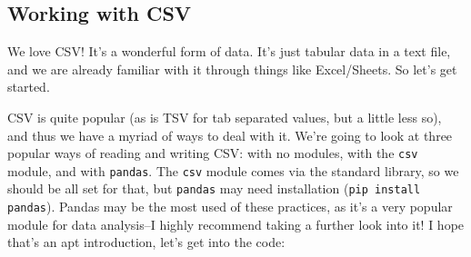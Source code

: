 \documentclass[12pt, twoside, reqno]{book}
\begin{document}
\subsection{Working with CSV}

We love CSV! It's a wonderful form of data. It's just tabular data in a text file, and we are already familiar with it through things like Excel/Sheets. So let's get started.

CSV is quite popular (as is TSV for tab separated values, but a little less so), and thus we have a myriad of ways to deal with it. We're going to look at three popular ways of reading and writing CSV: with no modules, with the \texttt{csv} module, and with \texttt{pandas}. The \texttt{csv} module comes via the standard library, so we should be all set for that, but \texttt{pandas} may need installation (\texttt{pip install pandas}). Pandas may be the most used of these practices, as it's a very popular module for data analysis--I highly recommend taking a further look into it! I hope that's an apt introduction, let's get into the code:
\end{document}

